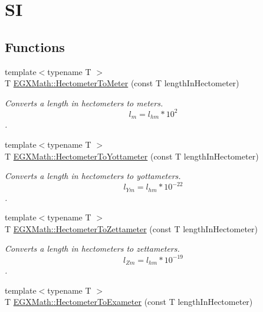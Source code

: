 \hypertarget{group___e_g_x_math-_conversions-_length_conversions-_hectometer-_s_i}{}\section{SI}
\label{group___e_g_x_math-_conversions-_length_conversions-_hectometer-_s_i}
\subsection*{Functions}
\begin{DoxyCompactItemize}
\item 
{\footnotesize template$<$typename T $>$ }\\T \mbox{\hyperlink{group___e_g_x_math-_conversions-_length_conversions-_hectometer-_s_i_ga785d53e7a9f74e669376b22db1acca4b}{E\+G\+X\+Math\+::\+Hectometer\+To\+Meter}} (const T length\+In\+Hectometer)
\begin{DoxyCompactList}\small\item\em Converts a length in hectometers to meters. \[ l_{m}=l_{hm} * 10^{2} \]. \end{DoxyCompactList}\item 
{\footnotesize template$<$typename T $>$ }\\T \mbox{\hyperlink{group___e_g_x_math-_conversions-_length_conversions-_hectometer-_s_i_ga6e5db7fe650b044f73f505673d7e484d}{E\+G\+X\+Math\+::\+Hectometer\+To\+Yottameter}} (const T length\+In\+Hectometer)
\begin{DoxyCompactList}\small\item\em Converts a length in hectometers to yottameters. \[ l_{Ym}=l_{hm} * 10^{-22} \]. \end{DoxyCompactList}\item 
{\footnotesize template$<$typename T $>$ }\\T \mbox{\hyperlink{group___e_g_x_math-_conversions-_length_conversions-_hectometer-_s_i_ga72ca6c210560d06577273cb2c1e44250}{E\+G\+X\+Math\+::\+Hectometer\+To\+Zettameter}} (const T length\+In\+Hectometer)
\begin{DoxyCompactList}\small\item\em Converts a length in hectometers to zettameters. \[ l_{Zm}=l_{hm} * 10^{-19} \]. \end{DoxyCompactList}\item 
{\footnotesize template$<$typename T $>$ }\\T \mbox{\hyperlink{group___e_g_x_math-_conversions-_length_conversions-_hectometer-_s_i_ga613414d30b834e129c315c144e7e01f7}{E\+G\+X\+Math\+::\+Hectometer\+To\+Exameter}} (const T length\+In\+Hectometer)

\end{DoxyCompactItemize}
